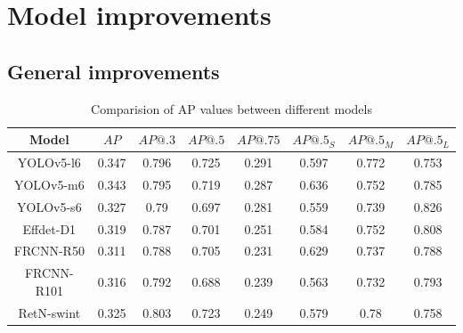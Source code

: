\section{Model improvements}
\subsection{General improvements}
\begin{table}[H]
    \centering
    \begin{tabular}{|c|c|c|c|c|c|c|c|}
        \hline
        Model      & $AP$  & $AP@.3$ & $AP@.5$ & $AP@.75$ & $AP@.5_S$ & $AP@.5_M$ & $AP@.5_L$ \\ \hline
        YOLOv5-l6  & 0.347 & 0.796   & 0.725   & 0.291    & 0.597     & 0.772     & 0.753     \\ \hline
        YOLOv5-m6  & 0.343 & 0.795   & 0.719   & 0.287    & 0.636     & 0.752     & 0.785     \\ \hline
        YOLOv5-s6  & 0.327 & 0.79    & 0.697   & 0.281    & 0.559     & 0.739     & 0.826     \\ \hline
        Effdet-D1  & 0.319 & 0.787   & 0.701   & 0.251    & 0.584     & 0.752     & 0.808     \\ \hline
        FRCNN-R50  & 0.311 & 0.788   & 0.705   & 0.231    & 0.629     & 0.737     & 0.788     \\ \hline
        FRCNN-R101 & 0.316 & 0.792   & 0.688   & 0.239    & 0.563     & 0.732     & 0.793     \\ \hline
        RetN-swint & 0.325 & 0.803   & 0.723   & 0.249    & 0.579     & 0.78      & 0.758     \\ \hline
    \end{tabular}
    \caption{Comparision of AP values between different models}
    \label{tab:improved:precision}
\end{table}


